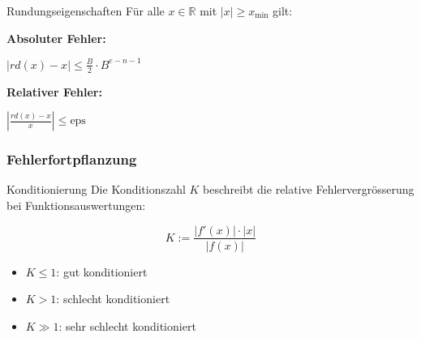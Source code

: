 \begin{corollary}{Rundungseigenschaften}
Für alle $x \in \mathbb{R}$ mit $|x| \geq x_{\text{min}}$ gilt:
\vspace{1mm}\\
\begin{minipage}[t]{0.45\textwidth}
    \textbf{Absoluter Fehler:}  
    \begin{center} $|rd(x) - x| \leq \frac{B}{2} \cdot B^{e-n-1}$ \end{center}
\end{minipage}
\hspace{3mm}
\begin{minipage}[t]{0.35\textwidth}
    \textbf{Relativer Fehler:}  
    \begin{center} $\left|\frac{rd(x)-x}{x}\right| \leq \text{eps}$ \end{center}
\end{minipage}
\end{corollary}

\subsubsection{Fehlerfortpflanzung}

\begin{concept}{Konditionierung}
    Die Konditionszahl $K$ beschreibt die relative Fehlervergrösserung bei Funktionsauswertungen:
    \vspace{1mm}\\
\begin{minipage}{0.3\textwidth}
    \vspace{-2mm}
    $$K := \frac{|f'(x)| \cdot |x|}{|f(x)|}$$
\end{minipage}
\hspace{2mm}
\begin{minipage}{0.6\textwidth}
\begin{itemize}
    \item $K \leq 1$: gut konditioniert
    \item $K > 1$: schlecht konditioniert
    \item $K \gg 1$: sehr schlecht konditioniert
\end{itemize}
\end{minipage}
\end{concept}

